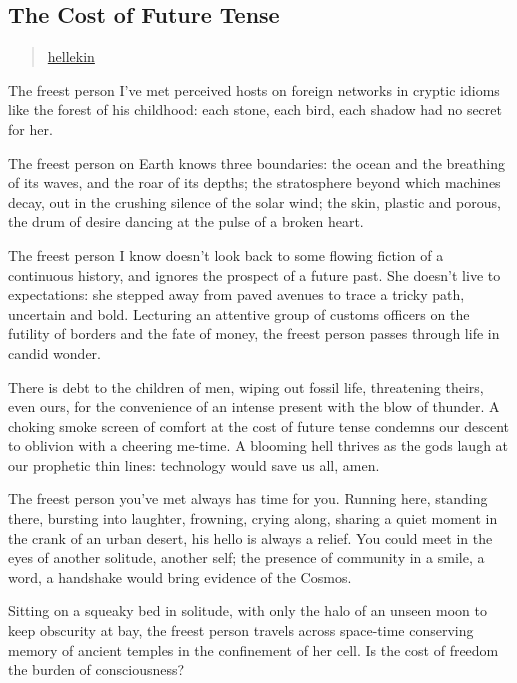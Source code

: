\subsection{The Cost of Future Tense}\label{the-cost-of-future-tense}

\begin{quote}
\hyperlink{hellekin}{hellekin}
\end{quote}

The freest person I've met perceived hosts on foreign networks in
cryptic idioms like the forest of his childhood: each stone, each bird,
each shadow had no secret for her.

The freest person on Earth knows three boundaries: the ocean and the
breathing of its waves, and the roar of its depths; the stratosphere
beyond which machines decay, out in the crushing silence of the solar
wind; the skin, plastic and porous, the drum of desire dancing at the
pulse of a broken heart.

The freest person I know doesn't look back to some flowing fiction of a
continuous history, and ignores the prospect of a future past. She
doesn't live to expectations: she stepped away from paved avenues to
trace a tricky path, uncertain and bold. Lecturing an attentive group of
customs officers on the futility of borders and the fate of money, the
freest person passes through life in candid wonder.

There is debt to the children of men, wiping out fossil life,
threatening theirs, even ours, for the convenience of an intense present
with the blow of thunder. A choking smoke screen of comfort at the cost
of future tense condemns our descent to oblivion with a cheering
me-time. A blooming hell thrives as the gods laugh at our prophetic thin
lines: technology would save us all, amen.

The freest person you've met always has time for you. Running here,
standing there, bursting into laughter, frowning, crying along, sharing
a quiet moment in the crank of an urban desert, his hello is always a
relief. You could meet in the eyes of another solitude, another self;
the presence of community in a smile, a word, a handshake would bring
evidence of the Cosmos.

Sitting on a squeaky bed in solitude, with only the halo of an unseen
moon to keep obscurity at bay, the freest person travels across
space-time conserving memory of ancient temples in the confinement of
her cell. Is the cost of freedom the burden of consciousness?
